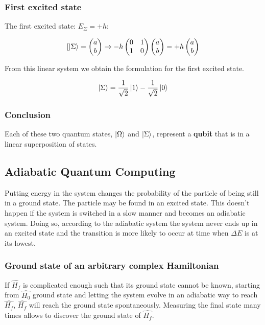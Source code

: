 		\subsubsection{First excited state}
		The first excited state: $E_\Sigma=+h$:

		$$[\ket{\Sigma}=\begin{pmatrix}a\\b\end{pmatrix}\rightarrow-h\begin{pmatrix}0&1\\1&0\end{pmatrix}\begin{pmatrix}a\\b\end{pmatrix}=+h\begin{pmatrix}a\\b\end{pmatrix}$$

		From this linear system we obtain the formulation for the first excited state.

		$$\ket{\Sigma}=\frac{1}{\sqrt{2}}\ket{1}-\frac{1}{\sqrt{2}}\ket{0}$$

		\subsubsection{Conclusion}
		Each of these two quantum states, $\ket{\Omega}$ and $\ket{\Sigma}$, represent a \textbf{qubit} that is in a linear superposition of states.\\

\subsection{Adiabatic Quantum Computing}
Putting energy in the system changes the probability of the particle of being still in a ground state.
The particle may be found in an excited state.
This doesn't happen if the system is switched in a slow manner and becomes an adiabatic system.
Doing so, according to the adiabatic system the system never ends up in an excited state and the transition is more likely to occur at time when $\Delta E$ is at its lowest.

	\subsubsection{Ground state of an arbitrary complex Hamiltonian}
	If $\hat{H_f}$ is complicated enough such that its ground state cannot be known, starting from $\hat{H_0}$ ground state and letting the system evolve in an adiabatic way to reach $\hat{H_f}$, $\hat{H_f}$ will reach the ground state spontaneously.
	Measuring the final state many times allows to discover the ground state of $\hat{H_f}$.

